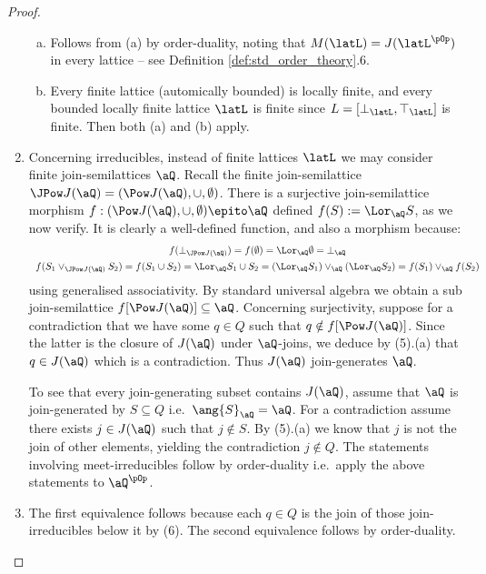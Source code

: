 \documentclass{article}
\begin{document}
\begin{proof}
\begin{enumerate}
\begin{enumerate}[(a)]
\item
Follows from (a) by order-duality, noting that $M(\latL) = J(\latL^{\pOp})$ in every lattice -- see Definition \ref{def:std_order_theory}.6.

\item
Every finite lattice (automically bounded) is locally finite, and every bounded locally finite lattice $\latL$ is finite since $L = [\bot_\latL,\top_\latL]$ is finite. Then both (a) and (b) apply.

\end{enumerate}


\item
Concerning irreducibles, instead of finite lattices $\latL$ we may consider finite join-semilattices $\aQ$. Recall the finite join-semilattice $\JPow J(\aQ) = (\Pow J(\aQ),\cup,\emptyset)$. There is a surjective join-semilattice morphism $f : (\Pow J(\aQ),\cup,\emptyset) \epito \aQ$ defined $f(S) := \Lor_\aQ S$, as we now verify. It is clearly a well-defined function, and also a morphism because:
\[
\begin{tabular}{c}
$f(\bot_{\JPow J(\aQ)}) = f(\emptyset) = \Lor_\aQ \emptyset = \bot_\aQ$
\\[1ex]
$f(S_1 \lor_{\JPow J(\aQ)} S_2) = f(S_1 \cup S_2) = \Lor_\aQ S_1 \cup S_2 = (\Lor_\aQ S_1) \lor_\aQ (\Lor_\aQ S_2) = f(S_1) \lor_\aQ f(S_2)$
\end{tabular}
\]
using generalised associativity. By standard universal algebra we obtain a sub join-semilattice $f[\Pow J(\aQ)] \subseteq \aQ$. Concerning surjectivity, suppose for a contradiction that we have some $q \in Q$ such that $q \notin f[\Pow J(\aQ)]$. Since the latter is the closure of $J(\aQ)$ under $\aQ$-joins, we deduce by (5).(a) that $q \in J(\aQ)$ which is a contradiction. Thus $J(\aQ)$ join-generates $\aQ$.

To see that every join-generating subset contains $J(\aQ)$, assume that $\aQ$ is join-generated by $S \subseteq Q$ i.e.\ $\ang{S}_\aQ = \aQ$. For a contradiction assume there exists $j \in J(\aQ)$ such that $j \notin S$. By (5).(a) we know that $j$ is not the join of other elements, yielding the contradiction $j \notin Q$. The statements involving meet-irreducibles follow by order-duality i.e.\ apply the above statements to $\aQ^{\pOp}$.


\item
The first equivalence follows because each $q \in Q$ is the join of those join-irreducibles below it by (6). The second equivalence follows by order-duality.


\end{enumerate}
\end{proof}
\end{document}

